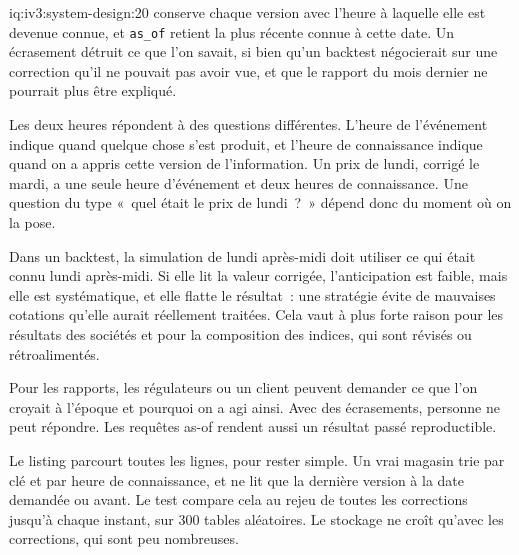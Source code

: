 \begin{solution}{iq:iv3:system-design:20}
 conserve chaque version avec l'heure à laquelle elle est devenue connue, et \texttt{as\_of} retient la plus récente connue à cette date. Un écrasement détruit ce que l'on savait, si bien qu'un backtest négocierait sur une correction qu'il ne pouvait pas avoir vue, et que le rapport du mois dernier ne pourrait plus être expliqué.
\label{lst:iv3:sd:bitemp}

Les deux heures répondent à des questions différentes. L'heure de l'événement indique quand quelque chose s'est produit, et l'heure de connaissance indique quand on a appris cette version de l'information. Un prix de lundi, corrigé le mardi, a une seule heure d'événement et deux heures de connaissance. Une question du type «~quel était le prix de lundi~?~» dépend donc du moment où on la pose.

Dans un backtest, la simulation de lundi après-midi doit utiliser ce qui était connu lundi après-midi. Si elle lit la valeur corrigée, l'anticipation est faible, mais elle est systématique, et elle flatte le résultat~: une stratégie évite de mauvaises cotations qu'elle aurait réellement traitées. Cela vaut à plus forte raison pour les résultats des sociétés et pour la composition des indices, qui sont révisés ou rétroalimentés.

Pour les rapports, les régulateurs ou un client peuvent demander ce que l'on croyait à l'époque et pourquoi on a agi ainsi. Avec des écrasements, personne ne peut répondre. Les requêtes as-of rendent aussi un résultat passé reproductible.

Le listing parcourt toutes les lignes, pour rester simple. Un vrai magasin trie par clé et par heure de connaissance, et ne lit que la dernière version à la date demandée ou avant. Le test compare cela au rejeu de toutes les corrections jusqu'à chaque instant, sur 300 tables aléatoires. Le stockage ne croît qu'avec les corrections, qui sont peu nombreuses.

\end{solution}

